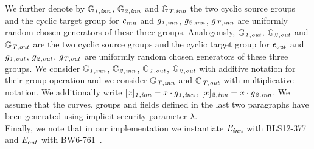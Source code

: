 \noindent We further denote by $\mathbb{G}_{\mathit{1,inn}}$, $\mathbb{G}_{\mathit{2,inn}}$ and $\mathbb{G}_{\mathit{T,inn}}$ the two cyclic source groups and the cyclic target group for $\mathit{e}_{\mathit{inn}}$ 
and $g_{\mathit{1,inn}}$, $g_{\mathit{2,inn}}$, $g_{\mathit{T,inn}}$ are uniformly random chosen generators of these three groups. Analogously, $\mathbb{G}_{\mathit{1,out}}$, 
$\mathbb{G}_{\mathit{2,out}}$ and $\mathbb{G}_{\mathit{T,out}}$ are the two cyclic source groups and the cyclic target group for $\mathit{e}_{\mathit{out}}$ and $g_{\mathit{1,out}}$, $g_{\mathit{2,out}}$, $g_{\mathit{T,out}}$ 
are uniformly random chosen generators of these three groups. We consider $\mathbb{G}_{\mathit{1,inn}}$, $\mathbb{G}_{\mathit{2,inn}}$, $\mathbb{G}_{\mathit{1,out}}$, $\mathbb{G}_{\mathit{2,out}}$ 
with additive notation for their group operation and we consider $\mathbb{G}_{\mathit{T,inn}}$ and $\mathbb{G}_{\mathit{T,out}}$ with multiplicative notation. 
We additionally write $[x]_{\mathit{1,inn}} = x \cdot g_{\mathit{1,inn}}$, $[x]_{\mathit{2,inn}} = x \cdot g_{\mathit{2,inn}}$. 
We assume that the curves, groups and fields defined in the last two paragraphs have been 
generated using implicit security parameter $\lambda$. \\

\noindent Finally, we note that in our implementation we instantiate $\mathit{E}_{\mathit{inn}}$ with BLS12-377~\cite{zexe} and $\mathit{E}_{\mathit{out}}$ with BW6-761~\cite{BW6}.




